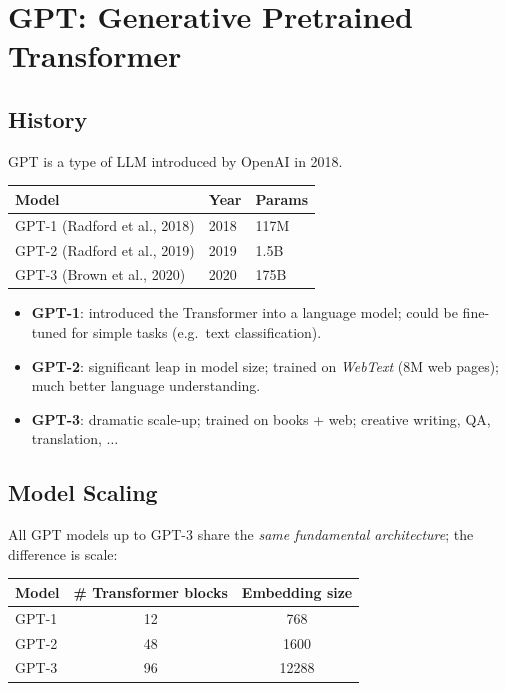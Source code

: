 \documentclass[11pt,a4paper]{article}
\theoremstyle{definition}
\theoremstyle{plain}
\theoremstyle{remark}
\begin{document}
\section{GPT: Generative Pretrained Transformer}

\subsection{History}

GPT is a type of LLM introduced by OpenAI in 2018.

\begin{center}
\begin{tabular}{lll}
    \hline
    \textbf{Model} & \textbf{Year} & \textbf{Params} \\
    \hline
    GPT-1 (Radford et al., 2018) & 2018 & 117M \\
    GPT-2 (Radford et al., 2019) & 2019 & 1.5B \\
    GPT-3 (Brown et al., 2020)   & 2020 & 175B \\
    \hline
\end{tabular}
\end{center}

\begin{itemize}
    \item \textbf{GPT-1}: introduced the Transformer into a language model; could be fine-tuned for simple tasks (e.g.\ text classification).
    \item \textbf{GPT-2}: significant leap in model size; trained on \emph{WebText} (8M web pages); much better language understanding.
    \item \textbf{GPT-3}: dramatic scale-up; trained on books + web; creative writing, QA, translation, $\ldots$
\end{itemize}

\subsection{Model Scaling}

All GPT models up to GPT-3 share the \emph{same fundamental architecture}; the difference is scale:

\begin{center}
\begin{tabular}{lcc}
    \hline
    \textbf{Model} & \textbf{\# Transformer blocks} & \textbf{Embedding size} \\
    \hline
    GPT-1 & 12 & 768   \\
    GPT-2 & 48 & 1600  \\
    GPT-3 & 96 & 12288 \\
    \hline
\end{tabular}
\end{center}
\end{document}
